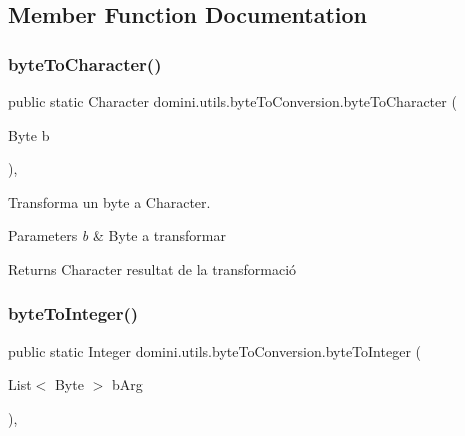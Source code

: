 \subsection{Member Function Documentation}
\mbox{\label{classdomini_1_1utils_1_1byteToConversion_a5d2f5f8de52e4001cf6698ca03fe31e8}} 
\subsubsection{\texorpdfstring{byte\+To\+Character()}{byteToCharacter()}}
{\footnotesize\ttfamily public static Character domini.\+utils.\+byte\+To\+Conversion.\+byte\+To\+Character (\begin{DoxyParamCaption}\item[{Byte}]{b }\end{DoxyParamCaption})\hspace{0.3cm}{\ttfamily [inline]}, {\ttfamily [static]}}



Transforma un byte a Character. 


\begin{DoxyParams}{Parameters}
{\em b} & Byte a transformar \\
\hline
\end{DoxyParams}
\begin{DoxyReturn}{Returns}
Character resultat de la transformació 
\end{DoxyReturn}
\mbox{\label{classdomini_1_1utils_1_1byteToConversion_a3242a47adade49b6cfa6a9232944f587}} 
\subsubsection{\texorpdfstring{byte\+To\+Integer()}{byteToInteger()}}
{\footnotesize\ttfamily public static Integer domini.\+utils.\+byte\+To\+Conversion.\+byte\+To\+Integer (\begin{DoxyParamCaption}\item[{List$<$ Byte $>$}]{b\+Arg }\end{DoxyParamCaption})\hspace{0.3cm}{\ttfamily [inline]}, {\ttfamily [static]}}




